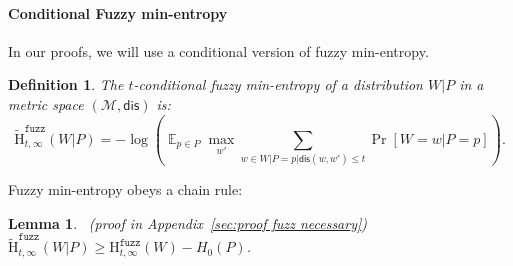 \documentclass[11pt]{article}
\newcommand{\apref}[1]{\mbox{Appendix~\ref{#1}}}
\DeclareMathOperator*{\expe}{\mathbb{E}}
\newcommand{\dis}{\ensuremath{\mathsf{dis}}}
\newcommand{\Hfuzz}{\mathrm{H}^{\mathtt{fuzz}}_{t,\infty}}
\newcommand{\Hfav}{\tilde{\mathrm{H}}^{\mathtt{fuzz}}_{t,\infty}}
\newtheorem{lemma}[theorem]{Lemma}
\newtheorem{definition}[theorem]{Definition}
\begin{document}
\paragraph{Conditional Fuzzy min-entropy}
In our proofs, we will use a conditional version of fuzzy min-entropy.
\begin{definition}
\label{def:cond fuzzy ent}
The $t$-conditional fuzzy min-entropy of a distribution $W |P$ in a metric space $(\mathcal{M}, \dis)$ is:
\[
\Hfav(W|P) = -\log \left( \expe_{p\in P} \max_{w'} \sum_{w\in W |P =p | \dis(w, w')\le t} \Pr[W=w|P=p]\right).
\]
\end{definition}

\noindent
Fuzzy min-entropy obeys a chain rule:
\begin{lemma}~(proof in \apref{sec:proof fuzz necessary})
\label{lem:chain rule fuzz}
$\Hfav(W|P) \ge \Hfuzz(W) - H_0(P)$.
\end{lemma}
\end{document}
